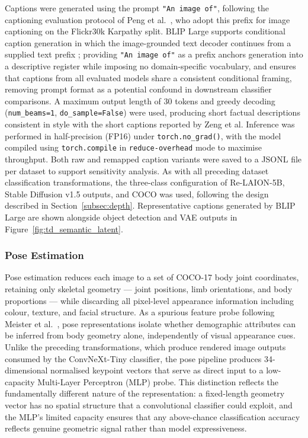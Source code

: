 Captions were generated using the prompt \texttt{"An image of"}, following 
the captioning evaluation protocol of Peng et 
al.\ \cite{Peng_2023_Kosmos2}, who adopt this prefix for image captioning 
on the Flickr30k Karpathy split. BLIP Large supports conditional caption 
generation in which the image-grounded text decoder continues from a 
supplied text prefix \cite{Li_2022_BLIP}; providing \texttt{"An image of"} 
as a prefix anchors generation into a descriptive register while imposing 
no domain-specific vocabulary, and ensures that captions from all evaluated 
models share a consistent conditional framing, removing prompt format as a 
potential confound in downstream classifier comparisons. A maximum output 
length of 30 tokens and greedy decoding (\texttt{num\_beams=1}, 
\texttt{do\_sample=False}) were used, producing short factual descriptions 
consistent in style with the short captions reported by Zeng et al. Inference was performed in half-precision (FP16) under \texttt{torch.no\_grad()}, with the model compiled using 
\texttt{torch.compile} in \texttt{reduce-overhead} mode to maximise 
throughput. Both raw and remapped caption variants were saved to a JSONL 
file per dataset to support sensitivity analysis. As with all preceding 
dataset classification transformations, the three-class configuration of 
Re-LAION-5B, Stable Diffusion v1.5 outputs, and COCO was used, following 
the design described in Section~\ref{subsec:depth}. Representative captions generated by BLIP Large are shown alongside object detection and VAE outputs in Figure~\ref{fig:td_semantic_latent}.


\subsubsection{Pose Estimation}
\label{subsec:pose}

Pose estimation reduces each image to a set of COCO-17 body joint 
coordinates, retaining only skeletal geometry --- joint positions, limb 
orientations, and body proportions --- while discarding all pixel-level 
appearance information including colour, texture, and facial structure. As 
a spurious feature probe following Meister et 
al.\ \cite{Meister_2023_GenderArtifactsinVisualDatasets}, pose 
representations isolate whether demographic attributes can be inferred from 
body geometry alone, independently of visual appearance cues. Unlike the 
preceding transformations, which produce rendered image outputs consumed by 
the ConvNeXt-Tiny classifier, the pose pipeline produces 34-dimensional 
normalised keypoint vectors that serve as direct input to a low-capacity 
Multi-Layer Perceptron (MLP) probe. This distinction reflects the 
fundamentally different nature of the representation: a fixed-length 
geometry vector has no spatial structure that a convolutional classifier 
could exploit, and the MLP's limited capacity ensures that any 
above-chance classification accuracy reflects genuine geometric signal 
rather than model expressiveness.

